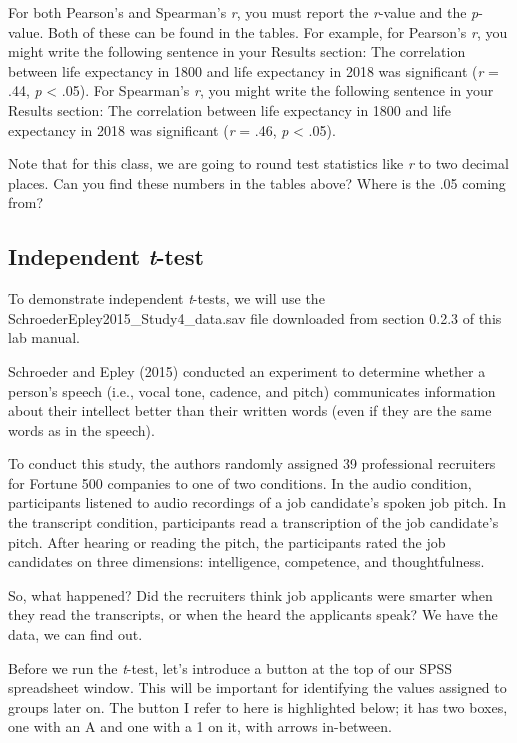 \documentclass[
]{book}
\begin{document}
For both Pearson's and Spearman's \emph{r}, you must report the \emph{r}-value and the \emph{p}-value. Both of these can be found in the tables. For example, for Pearson's \emph{r}, you might write the following sentence in your Results section:
The correlation between life expectancy in 1800 and life expectancy in 2018 was significant (\emph{r} = .44, \emph{p} \textless{} .05).
For Spearman's \emph{r}, you might write the following sentence in your Results section:
The correlation between life expectancy in 1800 and life expectancy in 2018 was significant (\emph{r} = .46, \emph{p} \textless{} .05).

Note that for this class, we are going to round test statistics like \emph{r} to two decimal places. Can you find these numbers in the tables above? Where is the .05 coming from?

\hypertarget{independent-t-test-1}{%
\subsection{\texorpdfstring{Independent \emph{t}-test}{Independent t-test}}\label{independent-t-test-1}}

To demonstrate independent \emph{t}-tests, we will use the SchroederEpley2015\_Study4\_data.sav file downloaded from section 0.2.3 of this lab manual.

Schroeder and Epley (2015) conducted an experiment to determine whether a person's speech (i.e., vocal tone, cadence, and pitch) communicates information about their intellect better than their written words (even if they are the same words as in the speech).

To conduct this study, the authors randomly assigned 39 professional recruiters for Fortune 500 companies to one of two conditions. In the audio condition, participants listened to audio recordings of a job candidate's spoken job pitch. In the transcript condition, participants read a transcription of the job candidate's pitch. After hearing or reading the pitch, the participants rated the job candidates on three dimensions: intelligence, competence, and thoughtfulness.

So, what happened? Did the recruiters think job applicants were smarter when they read the transcripts, or when the heard the applicants speak? We have the data, we can find out.

Before we run the \emph{t}-test, let's introduce a button at the top of our SPSS spreadsheet window. This will be important for identifying the values assigned to groups later on. The button I refer to here is highlighted below; it has two boxes, one with an A and one with a 1 on it, with arrows in-between.
\end{document}
